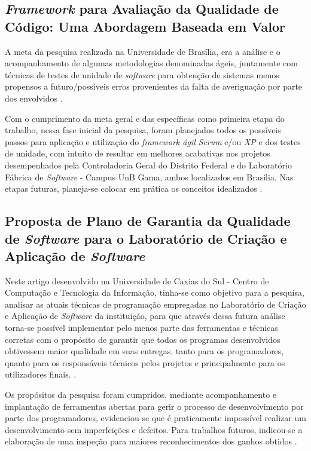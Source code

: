 \subsection{\textit{Framework} para Avaliação da Qualidade de Código: Uma
Abordagem Baseada em Valor \cite{Framework}}
A meta da pesquisa realizada na Universidade de Brasília, era a análise e o acompanhamento de algumas metodologias denominadas ágeis, juntamente com técnicas de testes de unidade de \textit{software} para obtenção de sistemas menos propensos a futuro/possíveis erros provenientes da falta de averiguação por parte dos envolvidos \cite{Framework}. 

Com o cumprimento da meta geral e das específicas como primeira etapa do trabalho, nessa fase inicial da pesquisa, foram planejados todos os possíveis passos para aplicação e utilização do \textit{framework ágil} \textit{Scrum} e/ou \textit{XP} e dos testes de unidade, com intuito de resultar em melhores acabativas nos projetos desempenhados pela  Controladoria Geral do Distrito Federal e do Laboratório Fábrica de \textit{Software} - Campus UnB Gama, ambos localizados em Brasília. Nas etapas futuras, planeja-se colocar em prática os conceitos idealizados \cite{Framework}.

\subsection{Proposta de Plano de Garantia da Qualidade de \textit{Software} para o Laboratório de
Criação e Aplicação de \textit{Software} \cite{PropostaDePlano}}

Neste artigo desenvolvido na Universidade de Caxias do Sul - Centro de Computação e Tecnologia da Informação, tinha-se como objetivo para a pesquisa, analisar as atuais técnicas de programação empregadas no Laboratório de Criação e Aplicação de \textit{Software} da instituição, para que através dessa futura análise torna-se possível implementar pelo menos parte das ferramentas e técnicas corretas com o propósito de garantir que todos os programas desenvolvidos obtivessem maior qualidade em suas entregas, tanto para os programadores, quanto para os responsáveis técnicos pelos projetos e principalmente para os utilizadores finais. \cite{PropostaDePlano}.

Os propósitos da pesquisa foram cumpridos, mediante acompanhamento e implantação de ferramentas abertas para gerir o processo de desenvolvimento por parte dos programadores, evidenciou-se que é praticamente impossível realizar um desenvolvimento sem imperfeições e defeitos. Para trabalhos futuros, indicou-se a elaboração de uma inspeção para maiores reconhecimentos dos ganhos obtidos \cite{PropostaDePlano}.

